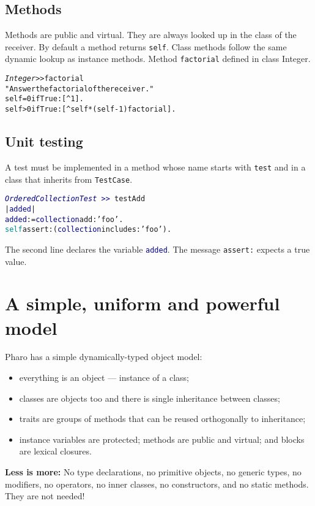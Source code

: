 \documentclass[notumble]{leaflet}
\makeatletter
\newcommand{\ct}[1]{{\textsf{#1}}\xspace}
\newenvironment{displaycode}{%
     \par
     \hspace{1.5em}\begin{minipage}{\linewidth}
       \begin{alltt}\small}{
       \end{alltt}
     \end{minipage}
     \par}
\newcommand{\code}[1]{\foreignlanguage{english}{\texttt{#1}}}
\makeatother
\begin{document}
\subsection{Methods}
Methods are public and virtual. They are always looked up in the class of the receiver. By default a method returns \code{self}. 
Class methods follow the same dynamic lookup as instance methods. 
Method \code{factorial} defined in class \ct{Integer}. 

\begin{displaycode}
\textit{Integer >>} factorial
   "Answer the factorial of the receiver."
   self = 0 ifTrue: [^ 1].
   self > 0 ifTrue: [^ self * (self - 1) factorial].
\end{displaycode}



\vspace{-0.3cm}
\subsection{Unit testing}
A test must be implemented in a method whose name starts with \code{test} and in a class that
inherits from \code{TestCase}.

\begin{displaycode}
\textcolor{darkBlue}{\textit{OrderedCollectionTest}\,>>}\,testAdd
  | \textcolor{darkBlue}{added} |
  \textcolor{darkBlue}{added} := \textcolor{darkBlue}{collection} add: \textcolor{string}{'foo'}.
  \textcolor{darkCyan}{self} assert: (\textcolor{darkBlue}{collection} includes: \textcolor{string}{'foo'}).
\end{displaycode}

The second line declares the variable \code{\textcolor{darkBlue}{added}}. The message \code{assert:} expects a true value.
\vspace{-0.3cm}
\section{A simple, uniform and powerful model}

Pharo has a simple dynamically-typed object model:
\begin{itemize}
\item everything is an object --- instance of a class;
\item classes are objects too and there is single inheritance between classes;
\item traits are groups of methods that can be reused orthogonally to inheritance;
\item instance variables are protected; methods are public and virtual;
and blocks are lexical closures.
\end{itemize}

\textbf{Less is more:}  No type declarations, no primitive
objects, no generic types, no modifiers, no operators, no inner
classes, no constructors, and no static methods. They are not needed!



\end{document}
